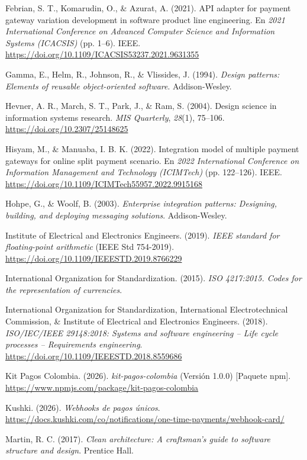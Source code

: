 \noindent Febrian, S. T., Komarudin, O., \& Azurat, A. (2021). API adapter for payment gateway variation development in software product line engineering. En \textit{2021 International Conference on Advanced Computer Science and Information Systems (ICACSIS)} (pp. 1--6). IEEE. \url{https://doi.org/10.1109/ICACSIS53237.2021.9631355}

\noindent Gamma, E., Helm, R., Johnson, R., \& Vlissides, J. (1994). \textit{Design patterns: Elements of reusable object-oriented software}. Addison-Wesley.

\noindent Hevner, A. R., March, S. T., Park, J., \& Ram, S. (2004). Design science in information systems research. \textit{MIS Quarterly}, \textit{28}(1), 75--106. \url{https://doi.org/10.2307/25148625}

\noindent Hisyam, M., \& Manuaba, I. B. K. (2022). Integration model of multiple payment gateways for online split payment scenario. En \textit{2022 International Conference on Information Management and Technology (ICIMTech)} (pp. 122--126). IEEE. \url{https://doi.org/10.1109/ICIMTech55957.2022.9915168}

\noindent Hohpe, G., \& Woolf, B. (2003). \textit{Enterprise integration patterns: Designing, building, and deploying messaging solutions}. Addison-Wesley.

\noindent Institute of Electrical and Electronics Engineers. (2019). \textit{IEEE standard for floating-point arithmetic} (IEEE Std 754-2019). \url{https://doi.org/10.1109/IEEESTD.2019.8766229}

\noindent International Organization for Standardization. (2015). \textit{ISO 4217:2015. Codes for the representation of currencies}.

\noindent International Organization for Standardization, International Electrotechnical Commission, \& Institute of Electrical and Electronics Engineers. (2018). \textit{ISO/IEC/IEEE 29148:2018: Systems and software engineering -- Life cycle processes -- Requirements engineering}. \url{https://doi.org/10.1109/IEEESTD.2018.8559686}

\noindent Kit Pagos Colombia. (2026). \textit{kit-pagos-colombia} (Versión 1.0.0) [Paquete npm]. \url{https://www.npmjs.com/package/kit-pagos-colombia}

\noindent Kushki. (2026). \textit{Webhooks de pagos únicos}. \url{https://docs.kushki.com/co/notifications/one-time-payments/webhook-card/}

\noindent Martin, R. C. (2017). \textit{Clean architecture: A craftsman's guide to software structure and design}. Prentice Hall.

